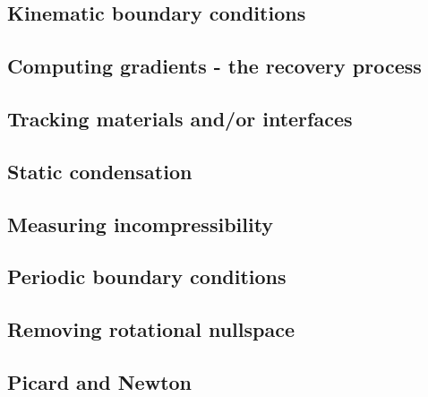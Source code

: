 \subsection{Kinematic boundary conditions}\label{kin_bc}  %
\newpage %
\subsection{Computing gradients - the recovery process}  %
\newpage %
\subsection{Tracking materials and/or interfaces}  %
\newpage %
\subsection{Static condensation}  %
\newpage %
\subsection{Measuring incompressibility \label{ss_incomp}}  %
\newpage %
\subsection{Periodic boundary conditions\label{ss_periodic}} %
\newpage %
\subsection{Removing rotational nullspace\label{ss_nullspace}}  %
\newpage %
\subsection{Picard and Newton \label{ss_nonlinear}}  %
\newpage %
